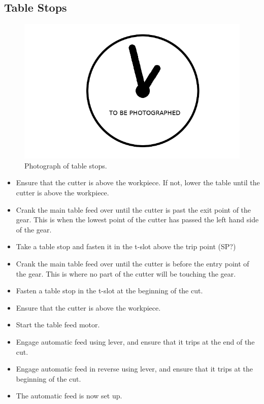 \documentclass[12pt,twoside,letterpaper]{article}
\begin{document}
\subsection{Table Stops}
\begin{figure}[H]
\centering
\includegraphics[width=5in]{imgpending}
	\caption{Photograph of table stops.}
\end{figure}

\begin{itemize}
\item Ensure that the cutter is above the workpiece. If not, lower the table until the cutter is above the workpiece.
\item Crank the main table feed over until the cutter is past the exit point of the gear. This is when the lowest point of the cutter has passed the left hand side of the gear.
\item Take a table stop and fasten it in the t-slot above the trip point (SP?)
\item Crank the main table feed over until the cutter is before the entry point of the gear. This is where no part of the cutter will be touching the gear.
\item Fasten a table stop in the t-slot at the beginning of the cut.
\item Ensure that the cutter is above the workpiece.
\item Start the table feed motor.
\item Engage automatic feed using lever, and ensure that it trips at the end of the cut.
\item Engage automatic feed in reverse using lever, and ensure that it trips at the beginning of the cut.
\item The automatic feed is now set up.
\end{itemize}
	
\end{document}
